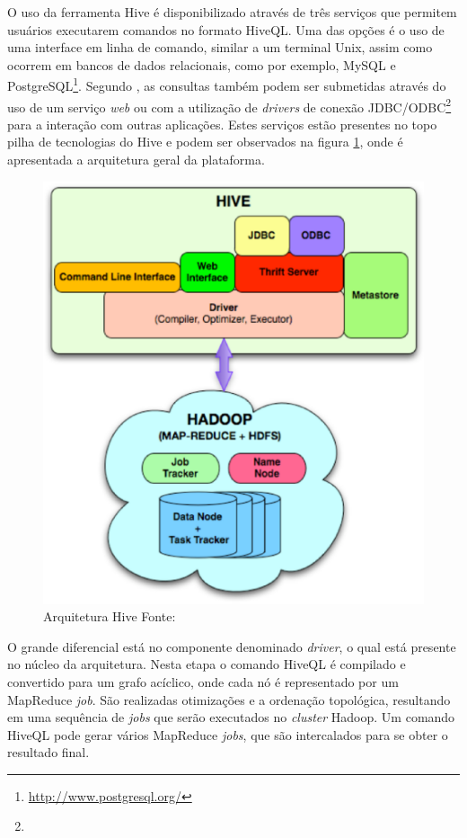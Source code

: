 O uso da ferramenta Hive é disponibilizado através de três serviços que permitem usuários executarem comandos no formato HiveQL. Uma das opções é o uso de uma interface em linha de comando, similar a um terminal Unix, assim como ocorrem em bancos de dados relacionais, como por exemplo, MySQL e PostgreSQL\footnote{\url{http://www.postgresql.org/}}. Segundo , as consultas também podem ser submetidas através do uso de um serviço \textit{web} ou com a utilização de \textit{drivers} de conexão JDBC/ODBC\footnote{} para a interação com outras aplicações. Estes serviços estão presentes no topo pilha de tecnologias do Hive e podem ser observados na figura \ref{fig-hive}, onde é apresentada a arquitetura geral da plataforma.

\begin{figure}[ht!]
	\centering
	\includegraphics[keepaspectratio=true,scale=0.5]
	  {figuras/hive.eps}
	\caption[Arquitetura Hive]{Arquitetura Hive
	\protect\linebreak Fonte: \cite{thusoo2009}}
	\label{fig-hive}
\end{figure}
\FloatBarrier

O grande diferencial está no componente denominado \textit{driver}, o qual está presente no núcleo da arquitetura. Nesta etapa o comando HiveQL é compilado e convertido para um grafo acíclico, onde cada nó é representado por um MapReduce \textit{job}. São realizadas otimizações e a ordenação topológica, resultando em uma sequência de \textit{jobs} que serão executados no \textit{cluster} Hadoop. Um comando HiveQL pode gerar vários MapReduce \textit{jobs}, que são intercalados para se obter o resultado final.


